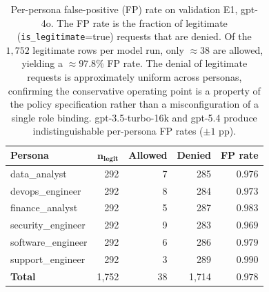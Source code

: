 \documentclass[10pt,a4paper,twocolumn]{article}
\begin{document}
\begin{table}[H]
\centering
\caption{Per-persona false-positive (FP) rate on validation E1, gpt-4o. The FP rate is the fraction of legitimate (\texttt{is\_legitimate}=true) requests that are denied. Of the $1{,}752$ legitimate rows per model run, only $\approx 38$ are allowed, yielding a $\approx 97.8\%$ FP rate. The denial of legitimate requests is approximately uniform across personas, confirming the conservative operating point is a property of the policy specification rather than a misconfiguration of a single role binding. gpt-3.5-turbo-16k and gpt-5.4 produce indistinguishable per-persona FP rates ($\pm 1$ pp).}
\label{tab:per_persona_fp}
\small
\setlength{\tabcolsep}{4pt}
\begin{tabular}{@{}lrrrr@{}}
\toprule
\textbf{Persona} & $\mathbf{n_{\text{legit}}}$ & \textbf{Allowed} & \textbf{Denied} & \textbf{FP rate} \\
\midrule
data\_analyst        & 292 & 7  & 285 & $0.976$ \\
devops\_engineer     & 292 & 8  & 284 & $0.973$ \\
finance\_analyst     & 292 & 5  & 287 & $0.983$ \\
security\_engineer   & 292 & 9  & 283 & $0.969$ \\
software\_engineer   & 292 & 6  & 286 & $0.979$ \\
support\_engineer    & 292 & 3  & 289 & $0.990$ \\
\midrule
\textbf{Total}       & 1{,}752 & 38 & 1{,}714 & $\mathbf{0.978}$ \\
\bottomrule
\end{tabular}
\end{table}
\end{document}
